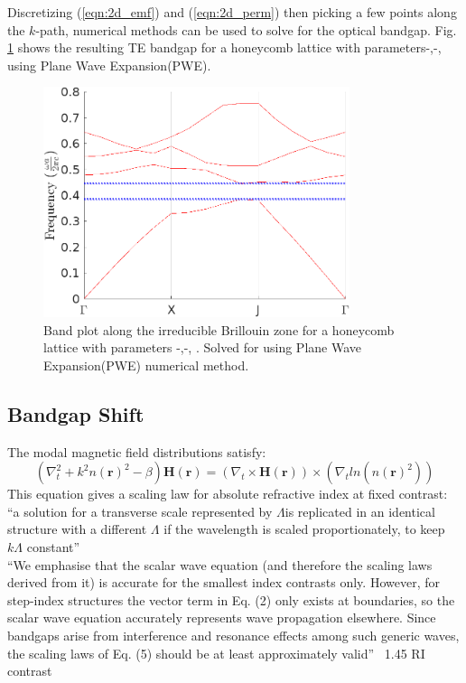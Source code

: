 Discretizing  (\ref{eqn:2d_emf}) and (\ref{eqn:2d_perm}) then picking a few points along the $k$-path, numerical methods can be used to solve for the optical bandgap. Fig. \ref{fig:2dbp} shows the resulting TE bandgap for a honeycomb lattice with parameters-,-, using Plane Wave Expansion(PWE)\cite{sukhoivanov}.
\begin{figure}[h]
	\centering
	\includegraphics[width=0.8\textwidth]{./Figures/HCPCF/2D_BandDiagram.png}
	\caption {Band plot along the irreducible Brillouin zone for a honeycomb lattice with parameters -,-, . Solved for using Plane Wave Expansion(PWE) numerical method\cite{sukhoivanov}.}
	\label{fig:2dbp}
\end{figure}

\clearpage
\subsection{Bandgap Shift}
The modal magnetic field distributions satisfy:
\begin{equation}
	(\nabla^2_t + k^2n(\boldsymbol{r})^2 - \beta)\boldsymbol{H(r)} = (\nabla_t\times\boldsymbol{H(r)})\times(\nabla_t ln(n(\boldsymbol{r})^2))
\end{equation}
This equation gives a scaling law for absolute refractive index at fixed contrast:
``a solution for a transverse scale represented by $\Lambda$is replicated in an identical structure with a different $\Lambda$ if the wavelength is scaled proportionately, to keep $k\Lambda$ constant''\\
``We emphasise that the scalar wave equation (and therefore the scaling laws derived from it) is accurate for the smallest index contrasts only. However, for step-index structures the vector term in Eq. (2) only exists at boundaries, so the scalar wave equation accurately represents wave propagation elsewhere. Since bandgaps arise from interference and resonance effects among such generic waves, the scaling laws of Eq. (5) should be at least approximately valid'' ~1.45 RI contrast\cite{birks}


